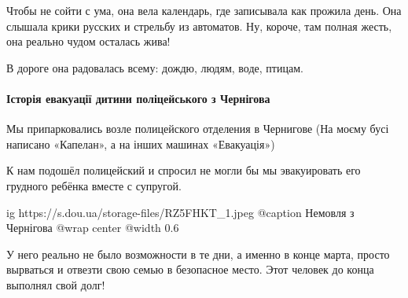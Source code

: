 Чтобы не сойти с ума, она вела календарь, где записывала как прожила день. Она
слышала крики русских и стрельбу из автоматов. Ну, короче, там полная жесть,
она реально чудом осталась жива!

В дороге она радовалась всему: дождю, людям, воде, птицам.

\paragraph{Історія евакуації дитини поліцейського з Чернігова}

Мы припарковались возле полицейского отделения в Чернигове (На моєму бусі
написано «Капелан», а на інших машинах «Евакуація»)

К нам подошёл полицейский и спросил не могли бы мы эвакуировать его грудного
ребёнка вместе с супругой.

\ifcmt
  ig https://s.dou.ua/storage-files/RZ5FHKT_1.jpeg
	@caption Немовля з Чернігова
  @wrap center
  @width 0.6
\fi

У него реально не было возможности в те дни, а именно в конце марта, просто
вырваться и отвезти свою семью в безопасное место. Этот человек до конца
выполнял свой долг!



